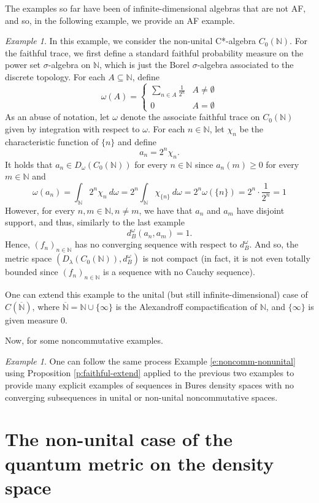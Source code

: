 \documentclass{amsart}
\theoremstyle{plain}
\theoremstyle{definition}
\theoremstyle{remark}
\newtheorem{example}[theorem]{Example}
\numberwithin{equation}{section}
\newcommand{\la}{{\lambda}}
\newcommand{\om}{{\omega}}
\newcommand{\N}{{\mathds{N}}}
\renewcommand{\geq}{\geqslant}
\begin{document}
The examples so far have been of infinite-dimensional algebras that are not AF, and so, in the following example, we provide an AF example.

\begin{example}\label{e:quantized}
    In this example, we consider the non-unital C*-algebra $C_0(\N)$. For the faithful trace, we first define a standard faithful probability  measure on the power set $\sigma$-algebra on $\N$, which is just the Borel $\sigma$-algebra associated to the discrete topology. For each $A\subseteq \N$, define
    \[
    \om(A)=\begin{cases}
        \sum_{n\in A} \frac{1}{2^{n}} & A\neq \emptyset\\
        0 & A=\emptyset
    \end{cases}
    \]
    As an abuse of notation, let $\om$ denote the associate faithful trace on $C_0(\N)$ given by integration with respect to $\om$. For each $n\in \N$, let $\chi_n$ be the characteristic function of $\{n\}$ and define
    \[
    a_n=2^n \chi_n.
    \]
    It holds that $a_n\in D_\om (C_0(\N))$ for every $n\in \N$
    since $a_n(m)\geq 0$ for every $m\in \N$ and 
    \[
    \om(a_n)=\int_\N 2^n\chi_n \ d\om=2^n \int_\N \chi_{\{n\}} \ d \om=2^n \om(\{n\})=2^n\cdot \frac{1}{2^n}=1
    \]
    However, for every $n,m\in \N, n\neq m$, we have that $a_n$ and $a_m$ have disjoint support, and thus, similarly to the last example
    \[
    d_B^\om(a_n,a_m)=1.
    \]
    Hence, $(f_n)_{n\in \N}$ has no converging sequence with respect to $d_B^\om$.  And so, the metric space  $(D_\la(C_0(\N)), d_B^\om)$ is not compact (in fact, it is not even totally bounded since $(f_n)_{n\in \N}$ is a sequence with no Cauchy sequence). 


    One can extend this example to the unital (but still infinite-dimensional) case of $C(\overline{\N})$, where $\overline{\N}=\N\cup \{\infty\}$ is the Alexandroff compactification of $\N$, and $\{\infty\}$ is given measure $0$. 
\end{example}
Now, for some noncommutative examples.
\begin{example}\label{e:quantized-N}
 One can    follow the same process Example \ref{e:noncomm-nonunital} using Proposition \ref{p:faithful-extend} applied to the previous two examples to provide many  explicit examples of sequences in Bures density spaces with no converging subsequences in unital or non-unital noncommutative spaces.
\end{example}

\section{The non-unital case of the quantum metric on the density space}\label{s:qm-non-u}
\end{document}
